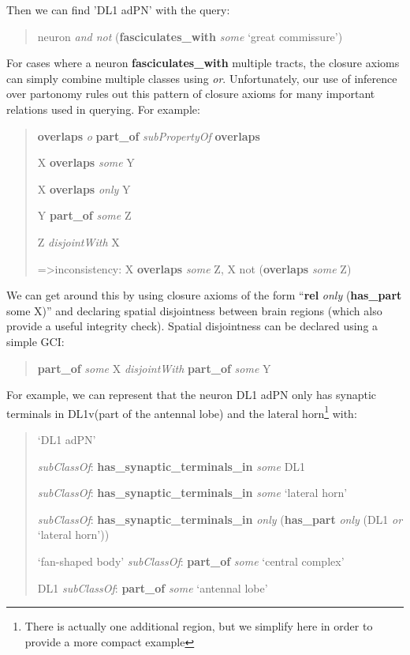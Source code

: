 \documentclass[runningheads,a4paper]{llncs}
\begin{document}
Then we can find 'DL1 adPN' with the query:
\begin{quote}
	neuron \textit{and not} (\textbf{fasciculates\_with} \textit{some} `great commissure')
\end{quote}

For cases where a neuron \textbf{fasciculates\_with} multiple tracts, the
closure axioms can simply combine multiple classes using
\textit{or}. Unfortunately, our use of inference over partonomy rules out
this pattern of closure axioms for many important relations used in querying.  For example:

\begin{quote}
\textbf{overlaps} \textit{o} \textbf{part\_of} \textit{subPropertyOf}
\textbf{overlaps}

X \textbf{overlaps} \textit{some} Y

X \textbf{overlaps} \textit{only} Y

Y \textbf{part\_of} \textit{some} Z

Z \textit{disjointWith} X

=\textgreater inconsistency: X \textbf{overlaps} \textit{some} Z, X not (\textbf{overlaps}
\textit{some} Z)
\end{quote}


We can get around this by using closure axioms of the form
``\textbf{rel} \textit{only} (\textbf{has\_part} some X)'' and declaring spatial
disjointness between brain regions (which also provide a useful
integrity check). Spatial disjointness can be declared using a simple
GCI:

\begin{quote}
\textbf{part\_of} \textit{some} X \textit{disjointWith} \textbf{part\_of} \textit{some} Y
\end{quote}

For example, we can represent that the neuron DL1 adPN only has
synaptic terminals in DL1v(part of the antennal lobe) and the lateral
horn\footnote{There is  actually one additional region, but we
  simplify here in order to  provide a more compact example} with:

\begin{quote}
`DL1 adPN'

\textit{subClassOf}: \textbf{has\_synaptic\_terminals\_in}
\textit{some} DL1

\textit{subClassOf}: \textbf{has\_synaptic\_terminals\_in}
\textit{some} `lateral horn'

\textit{subClassOf}: \textbf{has\_synaptic\_terminals\_in}
\textit{only} (\textbf{has\_part} \textit{only} (DL1 \textit{or}
`lateral horn'))

`fan-shaped body' \textit{subClassOf}: \textbf{part\_of} \textit{some}
`central complex'

DL1 \textit{subClassOf}: \textbf{part\_of} \textit{some} `antennal lobe'
\end{quote}
\end{document}
